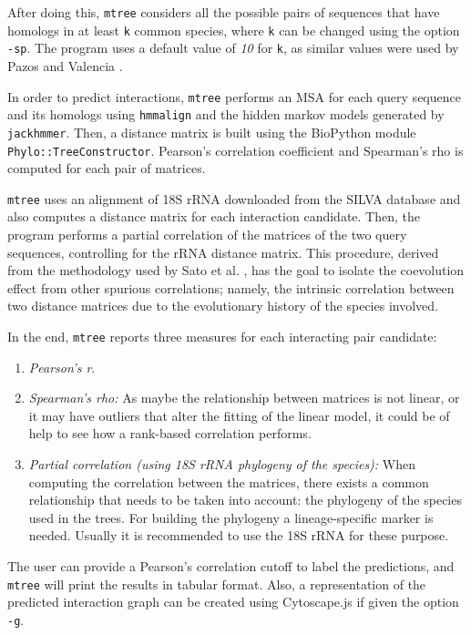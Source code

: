 \documentclass[11pt]{article}
\begin{document}
After doing this, \texttt{mtree} considers all the possible pairs of sequences that have homologs in at least \texttt{k} common species, where \texttt{k} can be changed using the option \texttt{-sp}. The program uses a default value of \emph{10} for \texttt{k}, as similar values were used by Pazos and Valencia \cite{Pazos2001}.


In order to predict interactions, \texttt{mtree} performs an MSA for each query sequence and its homologs using \texttt{hmmalign} and the hidden markov models generated by \texttt{jackhmmer}. Then, a distance matrix is built using the BioPython module \texttt{Phylo::TreeConstructor}. Pearson's correlation coefficient and Spearman's rho is computed for each pair of matrices. 

\texttt{mtree} uses an alignment of 18S rRNA downloaded from the SILVA database \cite{SILVA} and also computes a distance matrix for each interaction candidate. Then, the program performs a partial correlation of the matrices of the two query sequences, controlling for the rRNA distance matrix. This procedure, derived from the methodology used by Sato et al. \cite{Sato2005}, has the goal to isolate the coevolution effect from other spurious correlations; namely, the intrinsic correlation between two distance matrices due to the evolutionary history of the species involved.

In the end, \texttt{mtree} reports three measures for each interacting pair candidate:

\begin{enumerate}
\setlength{\itemsep}{1pt}
	\item \textit{Pearson's r}\cite{Pazos2001}.
	\item \textit{Spearman's rho:} As maybe the relationship between matrices is not linear, or it may have 		outliers that alter the fitting of the linear model, it could be of help to see how a rank-based correlation performs.
	\item \textit{Partial correlation (using 18S rRNA phylogeny of the species):} When 			computing the correlation between the matrices, there exists a common relationship that needs to be taken into account: 		the phylogeny of the species used in the trees. For building the phylogeny a lineage-specific marker is 		needed. Usually it is recommended to use the 18S rRNA for these purpose\cite{Sato2005}.
\end{enumerate}

The user can provide a Pearson's correlation cutoff to label the predictions, and \texttt{mtree} will print the results in tabular format. Also, a representation of the predicted interaction graph can be created using Cytoscape.js \cite{Franz15012016}  if given the option \texttt{-g}.
\end{document}
